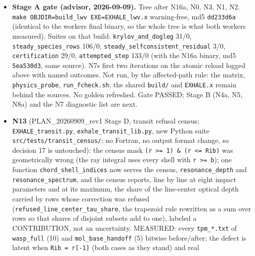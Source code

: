 \documentclass[english,a4paper]{my_memo}
\begin{document}
\begin{itemize}
  \texttt{steady\_newton} (\texttt{source\_closure.py}). \textbf{Reported, not fixed}:
  \texttt{largest\_step\_inside\_the\_species\_box} still annihilates a whole direction
  when any unheld unknown has no room on the side the direction points (an
  element physically zero in one cell can trigger it; the outcome is now
  named and the radius survives, the direction is lost): an active-set rule
  decision, for N4b. Two dead locals removed from \texttt{pgmres}.
\item
  \textbf{Stage A gate (advisor, 2026-09-09).} Tree after N16a, N0, N3, N1, N2.
  \texttt{make\ OBJDIR=build\_lwv\ EXE=EXHALE\_lwv.x} warning-free, md5 \texttt{dd233d6a}
  (identical to the worker\textquotesingle s final binary, so the whole tree is what both
  workers measured). Suites on that build: \texttt{krylov\_and\_dogleg} 31/0,
  \texttt{steady\_species\_rows} 106/0, \texttt{steady\_selfconsistent\_residual} 3/0,
  \texttt{certification} 29/0, \texttt{attempted\_step} 133/0 (with the N16a binary, md5
  \texttt{5ea530d3}, same source). N7\textquotesingle s first two iterations on the atomic reload
  logged above with named outcomes. Not run, by the affected-path rule: the
  matrix, \texttt{physics\_probe}, \texttt{run\_fcheck.sh}; the shared \texttt{build/} and
  \texttt{EXHALE.x} remain behind the sources. No golden refreshed. Gate PASSED;
  Stage B (N4a, N5, N8a) and the N7 diagnostic list are next.
\item
  \textbf{N13} (PLAN\_20260909\_rev1 Stage D, transit refusal census;
  \texttt{EXHALE\_transit.py}, \texttt{exhale\_transit\_lib.py}, new Python suite
  \texttt{src/tests/transit\_census/}; no Fortran, no output format change, so
  decision 17 is untouched): the census mask \texttt{(r\ \textgreater{}=\ 1)\ \&\ (r\ \textless{}=\ Rib)} was
  geometrically wrong (the ray integral uses every shell with \texttt{\textbar{}r\textbar{}\ \textgreater{}=\ b});
  one function \texttt{chord\_shell\_indices} now serves the census,
  \texttt{resonance\_depth} and \texttt{resonance\_spectrum}, and the census reports, line
  by line at eight impact parameters and at its maximum, the share of the
  line-center optical depth carried by rows whose correction was refused
  (\texttt{refused\_line\_center\_tau\_share}, the trapezoid rule rewritten as a sum
  over rows so that shares of disjoint subsets add to one), labeled a
  CONTRIBUTION, not an uncertainty. MEASURED: every \texttt{tpm\_*.txt} of
  \texttt{wasp\_full} (10) and \texttt{mol\_base\_handoff} (5) bitwise before/after; the
  defect is latent when \texttt{Rib\ =\ r{[}-1{]}} (both cases as they stand) and real

\end{itemize}
\end{document}
